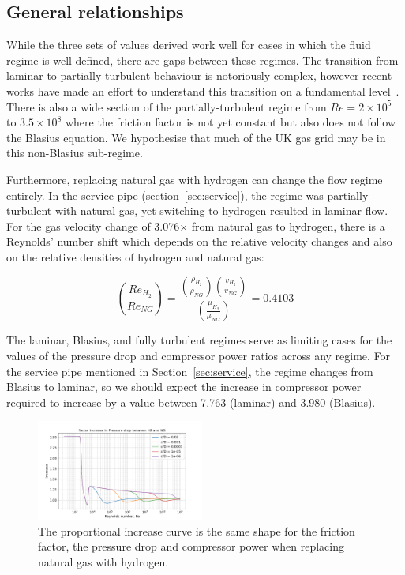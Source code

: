 \documentclass[5p]{elsarticle} %
\begin{document}
\subsection{General relationships}
\label{sec:nonblasius}

While the three sets of values derived work well for cases in which the fluid regime is well defined, there are gaps between these regimes. 
The transition from laminar to partially turbulent behaviour is notoriously complex, however recent works have made an effort to understand this transition on a fundamental level~\citep{Goldenfeld2006, She2012}.
There is also a wide section of the partially-turbulent regime from $Re = 2\times10^5$ to $3.5\times10^8$ where the friction factor is not yet constant but also does not follow the Blasius equation.
We hypothesise that much of the UK gas grid may be in this non-Blasius sub-regime.

Furthermore, replacing natural gas with hydrogen can change the flow regime entirely.
In the service pipe (section~\ref{sec:service}), the regime was partially turbulent with natural gas, yet switching to hydrogen resulted in laminar flow.
For the  gas velocity change of 3.076$\times$ from natural gas to hydrogen, there is a Reynolds' number shift which depends on the relative velocity changes and also on the relative densities of hydrogen and natural gas:

\begin{equation}
\label{eqn:reshift}
    \left(\frac{Re_{H_2}}{Re_{NG}}\right) = 
    \frac{
        \left(\frac{\rho_{H_2}}{\rho_{NG}}\right)
        \left(\frac{v_{H_2}}{v_{NG}}\right)
    }{
        \left(\frac{\mu_{H_2}}{\mu_{NG}}\right)
    } = \mathbf{0.4103}
\end{equation}

The laminar, Blasius, and fully turbulent regimes serve as limiting cases for the values of the pressure drop and compressor power ratios across any regime.
For the service pipe mentioned in Section~\ref{sec:service}, the regime changes from Blasius to laminar, so we should expect the increase in compressor power required to increase by a value between 7.763 (laminar) and 3.980 (Blasius). 

\begin{figure}[htb]
\centering
\includegraphics[width=0.49\textwidth]{p2_h2_ratio.png}
\caption{The proportional increase curve is the same shape  for the friction factor, the pressure drop  and compressor power when replacing natural gas with hydrogen.}
\label{fig:pressuredrop}
\end{figure}
\end{document}
